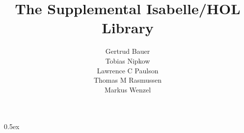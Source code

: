\documentclass[11pt,a4paper]{article}
\begin{document}
\title{The Supplemental Isabelle/HOL Library}
\author{
  Gertrud Bauer \\
  Tobias Nipkow \\
  Lawrence C Paulson \\
  Thomas M Rasmussen \\
  Markus Wenzel}
\maketitle

\tableofcontents
\newpage

\newcommand{\isabelletitle}{}\newcommand{\title}[1]{\gdef\isabelletitle{#1}}
\newcommand{\isabelleauthor}{}\newcommand{\author}[1]{\gdef\isabelleauthor{#1}}
\renewcommand{\isamarkupheader}[1]%
{\title{***~Theory ``\isabellecontext'': unknown title}\author{}%
#1%
\ifthenelse{\equal{}{\isabelletitle}}{}{\newpage\section{\isabelletitle}}%
\markright{THEORY~``\isabellecontext''}%
\ifthenelse{\equal{}{\isabelleauthor}}{}%
{{\flushright\footnotesize\sl (By \isabelleauthor)\par\bigskip}}}

\parindent 0pt \parskip 0.5ex


\pagestyle{headings}


\end{document}
